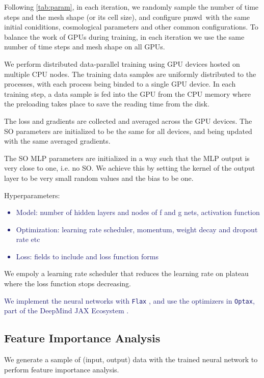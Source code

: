 \documentclass[modern, trackchanges, dvipsnames]{aastex631}
\newcommand{\pmwd}{{\usefont{T1}{nova}{m}{sl}pmwd}}
\newcommand{\YZ}[1]{\textcolor{MidnightBlue}{#1}}
\begin{document}
Following \autoref{tab:param}, in each iteration, we randomly sample the number
of time steps and the mesh shape (or its cell size), and configure \pmwd\ with
the same initial coniditions, cosmological parameters and other common
configurations.
To balance the work of GPUs during training, in each iteration we use
the same number of time steps and mesh shape on all GPUs.

We perform distributed data-parallel training using GPU devices hosted on
multiple CPU nodes.
The training data samples are uniformly distributed to the processes, with
each process being binded to a single GPU device.
In each training step, a data sample is fed into the GPU from the CPU memory
where the preloading takes place to save the reading time from the disk.

The loss and gradients are collected and averaged across the GPU devices.
The SO parameters are initialized to be the same for all devices, and being
updated with the same averaged gradients.

The SO MLP parameters are initialized in a way such that the MLP output is very
close to one, i.e. no SO.
We achieve this by setting the kernel of the output layer to be very small
random values and the bias to be one.

Hyperparameters:
\YZ{
\begin{itemize}
  \item Model: number of hidden layers and nodes of f and g nets, activation function
  \item Optimization: learning rate scheduler, momentum, weight decay and dropout rate etc
  \item Loss: fields to include and loss function forms
\end{itemize}
}

We empoly a learning rate scheduler that reduces the learning rate on plateau
where the loss function stops decreasing.


\YZ{
We implement the neural networks with \texttt{Flax} \citep{flax2020github}, and
use the optimizers in \texttt{Optax}, part of the DeepMind JAX Ecosystem
\citep{deepmind2020jax}.
}


\vspace{1em}
\subsection{Feature Importance Analysis}

We generate a sample of (input, output) data with the trained neural network to
perform feature importance analysis.
\end{document}
